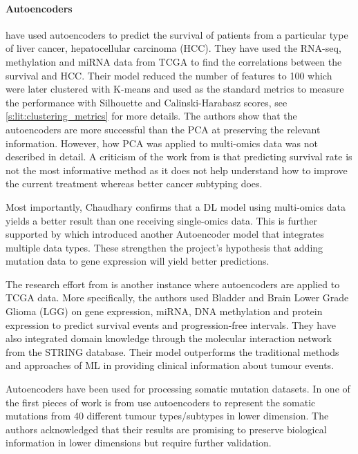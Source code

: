 \paragraph*{Autoencoders} \label{s:lit:autoencoders}

\citet{Chaudhary2018-qj} have used autoencoders to predict the survival of patients from a particular type of liver cancer, hepatocellular carcinoma (HCC). They have used the RNA-seq, methylation and miRNA data from TCGA to find the correlations between the survival and HCC. Their model reduced the number of features to 100 which were later clustered with K-means and used as the standard metrics to measure the performance with Silhouette and Calinski-Harabasz scores, see \cref{s:lit:clustering_metrics} for more details. The authors show that the autoencoders are  more successful than the PCA at preserving the relevant information. However, how PCA was applied to multi-omics data was not described in detail. A criticism of the work from \citeauthor{Chaudhary2018-qj} is that predicting survival rate is not the most informative method as it does not help understand how to improve the current treatment whereas better cancer subtyping does.

Most importantly, Chaudhary confirms that a DL model using multi-omics data yields a better result than one receiving single-omics data. This is further supported by \citet{Ma2019-hk} which introduced another Autoencoder model that integrates multiple data types. These strengthen the project's hypothesis that adding mutation data to gene expression will yield better predictions.

The research effort from \citet{Ma2019-hk} is another instance where autoencoders are applied to TCGA data. More specifically, the authors used Bladder and Brain Lower Grade Glioma (LGG) on gene expression, miRNA, DNA methylation and protein expression to predict survival events and progression-free intervals. They have also integrated domain knowledge through the molecular interaction network from the STRING database. Their model outperforms the traditional methods and approaches of ML in providing clinical information about tumour events.

Autoencoders have been used for processing somatic mutation datasets. In one of the first pieces of work is from \cite{Palazzo2019-hx} use autoencoders to represent the somatic mutations from 40 different tumour types/subtypes in lower dimension. The authors acknowledged that their results are promising to preserve biological information in lower dimensions but require further validation.

